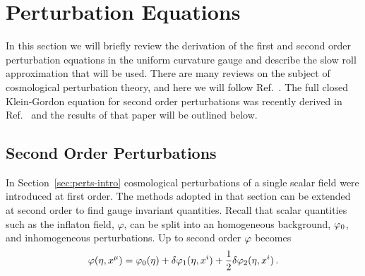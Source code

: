 % 
% 
% 
% 
\section{Perturbation Equations}
\label{sec:perts-num}


In this section we will briefly review the derivation of the first and
second order perturbation equations in the uniform curvature gauge and describe
the slow roll approximation that will be used. There are
many reviews on the subject of cosmological perturbation theory, and
here we will follow Ref.~\cite{Malik:2008im}.  The full closed
Klein-Gordon equation for second order perturbations was recently
derived in Ref.~\cite{Malik:2006ir} and the results of that paper will be
outlined below.

\subsection{Second Order Perturbations}
\label{sec:fosoperts-num}
In Section~\ref{sec:perts-intro} cosmological perturbations of a single scalar field
were introduced at first order. 
The methods adopted in that section can be extended at second
order to
find gauge invariant quantities. Recall that scalar quantities such as the inflaton
field, $\varphi$, can be split into an homogeneous background, $\varphi_0$, and
inhomogeneous perturbations. Up to second order $\varphi$ becomes
%  
\begin{equation}
 \varphi(\eta, x^\mu) = \varphi_0(\eta) + \delta\varphi_{1}(\eta, x^i) + \frac{1}{2}\delta\varphi_{2}(\eta, x^i)
\,.
\end{equation}

